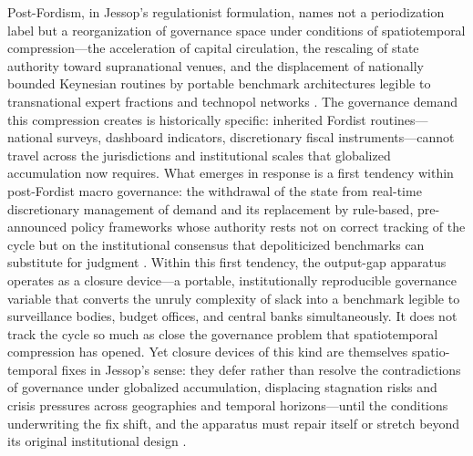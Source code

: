 \documentclass[11pt,a4paper]{article}
\begin{document}
Post-Fordism, in Jessop's regulationist formulation, names not a periodization
label but a reorganization of governance space under conditions of spatiotemporal
compression---the acceleration of capital circulation, the rescaling of state
authority toward supranational venues, and the displacement of nationally bounded
Keynesian routines by portable benchmark architectures legible to transnational
expert fractions and technopol networks
\citep{Jessop2002,Jessop2004,Sklair2000}. The governance demand this compression
creates is historically specific: inherited Fordist routines---national surveys,
dashboard indicators, discretionary fiscal instruments---cannot travel across the
jurisdictions and institutional scales that globalized accumulation now requires.
What emerges in response is a first tendency within post-Fordist macro governance:
the withdrawal of the state from real-time discretionary management of demand and
its replacement by rule-based, pre-announced policy frameworks whose authority
rests not on correct tracking of the cycle but on the institutional consensus that
depoliticized benchmarks can substitute for judgment
\citep{Jessop2002,SaadFilho2018}. Within this first tendency, the output-gap
apparatus operates as a closure device---a portable, institutionally reproducible
governance variable that converts the unruly complexity of slack into a benchmark
legible to surveillance bodies, budget offices, and central banks simultaneously.
It does not track the cycle so much as close the governance problem that
spatiotemporal compression has opened. Yet closure devices of this kind are
themselves spatio-temporal fixes in Jessop's sense: they defer rather than resolve
the contradictions of governance under globalized accumulation, displacing
stagnation risks and crisis pressures across geographies and temporal
horizons---until the conditions underwriting the fix shift, and the apparatus must
repair itself or stretch beyond its original institutional design
\citep{Jessop2004}.


\end{document}
